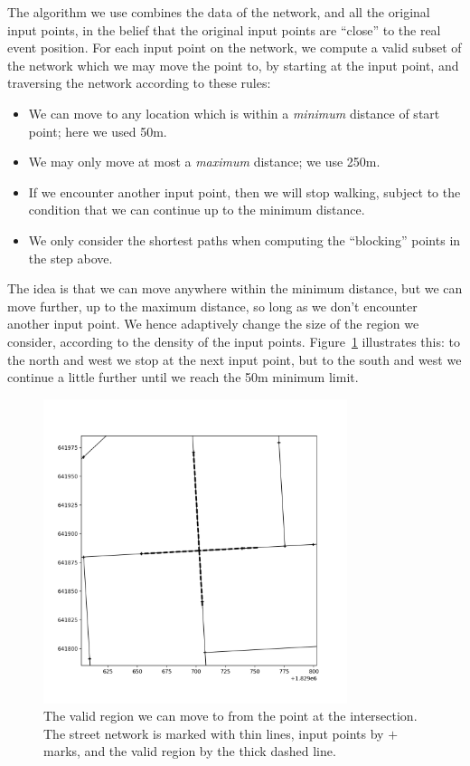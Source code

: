 \documentclass[twoside,a4paper,twocolumn,10pt]{article}
\theoremstyle{plain}
\theoremstyle{definition}
\begin{document}
The algorithm we use combines the data
of the network, and all the original input points, in the belief that the original input points
are ``close'' to the real event position.  For each input point on the network, we compute
a valid subset of the network which we may move the point to, by starting at the input point, and
traversing the network according to these rules:
\begin{itemize}
\item We can move to any location which is within a \emph{minimum} distance of start point;
here we used 50m.
\item We may only move at most a \emph{maximum} distance; we use 250m.
\item If we encounter another input point, then we will stop walking, subject to the condition
that we can continue up to the minimum distance.
\item We only consider the shortest paths when computing the ``blocking'' points in the
step above.
\end{itemize}
The idea is that we can move anywhere within the minimum distance, but we can move further,
up to the maximum distance, so long as we don't encounter another input point.  We hence adaptively
change the size of the region we consider, according to the density of the input points.
Figure~\ref{fig:sf_flow_network} illustrates this: to the north and west we stop at the next
input point, but to the south and west we continue a little further until we reach the 50m
minimum limit.

\begin{figure}
  \includegraphics[width=3.5in]{sf_flow_network.png}
  \caption{The valid region we can move to from the point at the intersection.
The street network is marked with thin lines, input points by $+$ marks, and the valid
region by the thick dashed line.}
  \label{fig:sf_flow_network}
\end{figure}
\end{document}
